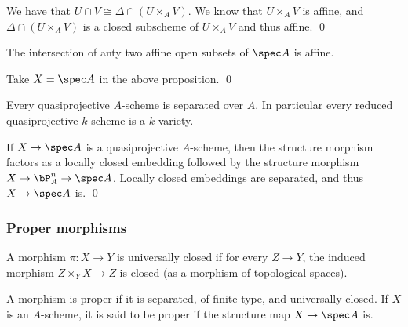     We have that $U\cap V\cong\Delta\cap(U\times_AV)$.
    We know that $U\times_AV$ is affine, and $\Delta\cap(U\times_AV)$ is a closed subscheme of $U\times_AV$
    and thus affine.
    \qed

\eproof

\bcoro

    The intersection of anty two affine open subsets of $\spec A$ is affine.

\ecoro

\bproof

    Take $X=\spec A$ in the above proposition.
    \qed

\eproof

\bcoro[name={quasiprojseparated}]

    Every quasiprojective $A$-scheme is separated over $A$.
    In particular every reduced quasiprojective $k$-scheme is a $k$-variety.

\ecoro

\bproof

    If $X\to\spec A$ is a quasiprojective $A$-scheme, then the structure morphism factors as a locally closed
    embedding followed by the structure morphism $X\to\bP^n_A\to\spec A$.
    Locally closed embeddings are separated, and thus $X\to\spec A$ is.
    \qed

\eproof

\subsubsection{Proper morphisms}

\bdefn

    A morphism $\pi\colon X\to Y$ is {\emphcolor universally closed} if for every $Z\to Y$, the induced
    morphism $Z\times_YX\to Z$ is closed (as a morphism of topological spaces).

    A morphism is {\emphcolor proper} if it is separated, of finite type, and universally closed.
    If $X$ is an $A$-scheme, it is said to be {\emphcolor proper} if the structure map $X\to\spec A$ is.

\edefn

